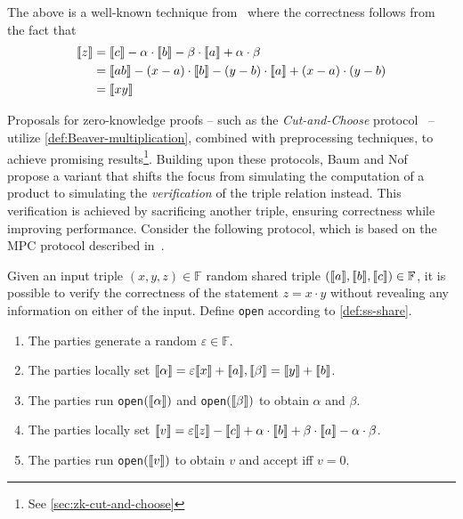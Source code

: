 \documentclass[11pt]{report}
\theoremstyle{definition}
\theoremstyle{plain}
\begin{document}
The above is a well-known technique from~\cite{Beaver1992efficient} where the correctness follows from the fact that
\begin{align*}
  \llbracket z \rrbracket & = \llbracket c \rrbracket - \alpha \cdot \llbracket b \rrbracket - \beta \cdot \llbracket a \rrbracket + \alpha \cdot \beta        \\
         & = \llbracket ab \rrbracket - (x - a) \cdot \llbracket b \rrbracket - (y - b) \cdot \llbracket a \rrbracket + (x - a) \cdot (y - b) \\
         & = \llbracket xy \rrbracket
\end{align*}

Proposals for zero-knowledge proofs -- such as the \textit{Cut-and-Choose} protocol~\cite{katz2018improved,baum2020concretely} -- utilize \autoref{def:Beaver-multiplication}, combined with preprocessing techniques, to achieve promising results\footnote{See \autoref{sec:zk-cut-and-choose}}. Building upon these protocols, Baum and Nof~\cite{baum2020concretely} propose a variant that shifts the focus from simulating the computation of a product to simulating the \textit{verification} of the triple relation instead. This verification is achieved by sacrificing another triple, ensuring correctness while improving performance. Consider the following protocol, which is based on the MPC protocol described in~\cite{damgaard2012multiparty}.

\begin{protocol}\label{def:sacrifice}
  Given an input triple $(x,y,z) \in \mathbb{F}$ random shared triple $(\llbracket a \rrbracket, \llbracket b \rrbracket, \llbracket c \rrbracket) \in \mathbb{F}$, it is possible to verify the correctness of the statement $z = x \cdot y$ without revealing any information on either of the input. Define \texttt{open} according to \autoref{def:ss-share}.
  \begin{enumerate}
    \item The parties generate a random $\varepsilon \in \mathbb{F}$.
    \item The parties locally set $\llbracket \alpha \rrbracket = \varepsilon\llbracket x \rrbracket + \llbracket a \rrbracket, \llbracket \beta \rrbracket = \llbracket y \rrbracket + \llbracket b \rrbracket$.
    \item The parties run \texttt{open}$(\llbracket \alpha \rrbracket)$ and \texttt{open}$(\llbracket \beta \rrbracket)$ to obtain $\alpha$ and $\beta$.
    \item The parties locally set $\llbracket v \rrbracket = \varepsilon\llbracket z \rrbracket - \llbracket c \rrbracket + \alpha  \cdot \llbracket b \rrbracket + \beta  \cdot \llbracket a \rrbracket - \alpha  \cdot \beta$.
    \item The parties run \texttt{open}$(\llbracket v \rrbracket)$ to obtain $v$ and accept iff $v = 0$.
  \end{enumerate}
\end{protocol}
\end{document}
